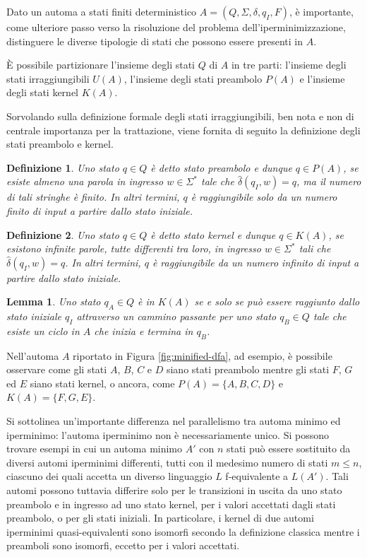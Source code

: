 \documentclass[a4paper,12pt]{report} %
\newtheorem{definition}{Definizione}[chapter] %
\newtheorem{lemma}{Lemma}[chapter]            %
\begin{document}
Dato un automa a stati finiti deterministico $A = (Q, \Sigma, \delta, q_I, F)$, è importante, come ulteriore
passo verso la risoluzione del problema dell'iperminimizzazione, distinguere le diverse tipologie di stati 
che possono essere presenti in $A$.

È possibile partizionare l'insieme degli stati $Q$ di $A$ in tre parti: l'insieme degli stati irraggiungibili $U(A)$, 
l'insieme degli stati preambolo $P(A)$ e l'insieme degli stati kernel $K(A)$.

Sorvolando sulla definizione formale degli stati irraggiungibili, ben nota e non di centrale importanza per
la trattazione, viene fornita di seguito la definizione degli stati preambolo e kernel.

\begin{definition}\label{def:preamble-state}
  Uno stato $q \in Q$ è detto \emph{stato preambolo} e dunque $q \in P(A)$, se esiste almeno una parola in 
  ingresso $w \in \Sigma^*$ tale che $\hat{\delta}(q_I, w) = q$, ma il numero di tali stringhe è finito.
  In altri termini, $q$ è raggiungibile solo da un numero finito di input a partire dallo stato iniziale.
\end{definition}

\begin{definition}\label{def:kernel-state}
  Uno stato $q \in Q$ è detto \emph{stato kernel} e dunque $q \in K(A)$, se esistono infinite parole, tutte differenti tra loro, 
  in ingresso $w \in \Sigma^*$ tali che $\hat{\delta}(q_I, w) = q$.
  In altri termini, $q$ è raggiungibile da un numero infinito di input a partire dallo stato iniziale.
\end{definition}

\begin{lemma}\label{lem:kernel-state}
  Uno stato $q_A \in Q$ è in $K(A)$ se e solo se può essere raggiunto dallo stato iniziale $q_I$ attraverso
  un cammino passante per uno stato $q_B \in Q$ tale che esiste un ciclo in $A$ che inizia e termina in $q_B$.
\end{lemma}

Nell'automa $A$ riportato in Figura \ref{fig:minified-dfa}, ad esempio, è possibile osservare come gli stati 
$A$, $B$, $C$ e $D$ siano stati preambolo mentre gli stati $F$, $G$ ed $E$ siano stati kernel, o ancora, come
$P(A) = \{ A, B, C, D \}$ e $K(A) = \{ F, G, E \}$.

Si sottolinea un'importante differenza nel parallelismo tra automa minimo ed iperminimo: l'automa iperminimo
non è necessariamente unico. Si possono trovare esempi in cui un automa minimo $A'$ con $n$ stati può essere 
sostituito da diversi automi iperminimi differenti, tutti con il medesimo numero di stati $m \le n$,
ciascuno dei quali accetta un diverso linguaggio $L$ f-equivalente a $L(A')$. Tali automi possono tuttavia
differire solo per le transizioni in uscita da uno stato preambolo e in ingresso ad uno stato kernel, per i
valori accettati dagli stati preambolo, o per gli stati iniziali. In particolare, i kernel di due automi
iperminimi quasi-equivalenti sono isomorfi secondo la definizione
classica mentre i preamboli sono isomorfi, eccetto per i valori accettati.
\end{document}
